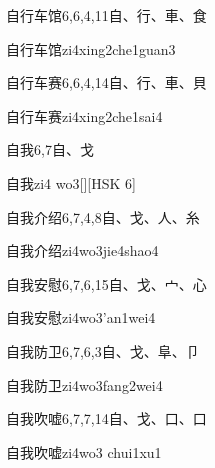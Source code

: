 \begin{Entry}{自行车馆}{6,6,4,11}{⾃、⾏、⾞、⾷}
  \begin{Phonetics}{自行车馆}{zi4xing2che1guan3}
  \end{Phonetics}
\end{Entry}

\begin{Entry}{自行车赛}{6,6,4,14}{⾃、⾏、⾞、⾙}
  \begin{Phonetics}{自行车赛}{zi4xing2che1sai4}
  \end{Phonetics}
\end{Entry}

\begin{Entry}{自我}{6,7}{⾃、⼽}
  \begin{Phonetics}{自我}{zi4 wo3}[][HSK 6]
  \end{Phonetics}
\end{Entry}

\begin{Entry}{自我介绍}{6,7,4,8}{⾃、⼽、⼈、⽷}
  \begin{Phonetics}{自我介绍}{zi4wo3jie4shao4}
  \end{Phonetics}
\end{Entry}

\begin{Entry}{自我安慰}{6,7,6,15}{⾃、⼽、⼧、⼼}
  \begin{Phonetics}{自我安慰}{zi4wo3'an1wei4}
  \end{Phonetics}
\end{Entry}

\begin{Entry}{自我防卫}{6,7,6,3}{⾃、⼽、⾩、⼙}
  \begin{Phonetics}{自我防卫}{zi4wo3fang2wei4}
  \end{Phonetics}
\end{Entry}

\begin{Entry}{自我吹嘘}{6,7,7,14}{⾃、⼽、⼝、⼝}
  \begin{Phonetics}{自我吹嘘}{zi4wo3 chui1xu1}
  \end{Phonetics}
\end{Entry}

